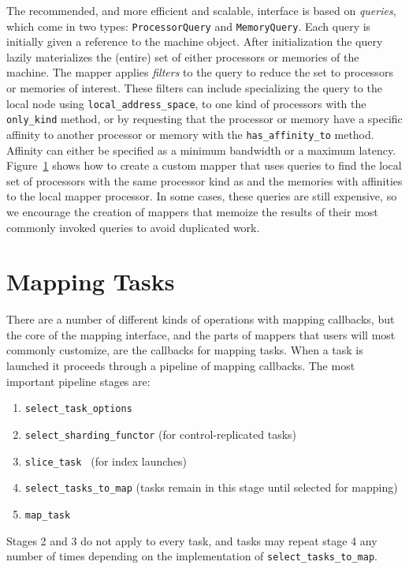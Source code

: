 The recommended, and more efficient and scalable, interface is based
on {\em queries}, which come in two types: {\tt ProcessorQuery} and 
{\tt MemoryQuery}. Each query is initially given a reference to the machine
object. After initialization the query lazily materializes the (entire) set of 
either processors or memories of the machine.
The mapper applies {\em filters} to the query to reduce the
set to processors or memories of interest.  These filters can include specializing
the query to the local node using {\tt local\_address\_space}, to one kind of processors with the {\tt only\_kind} method, or by
requesting that the processor or memory have a specific affinity to another
processor or memory with the {\tt has\_affinity\_to} method. Affinity can either be
specified as a minimum bandwidth or a maximum latency. Figure~\ref{fig:mapper_machine}
shows how to create a custom mapper that uses queries to find the local set of 
processors with the same processor kind as and the memories with affinities to the local
mapper processor. In some cases, these queries are still expensive, so we
encourage the creation of mappers that memoize the results of their most 
commonly invoked queries to avoid duplicated work.

\begin{figure}
  {\small
}
\caption{}
\label{fig:mapper_machine}
\end{figure}


\section{Mapping Tasks}
\label{sec:mapping:tasks}

There are a number of different kinds of operations with mapping callbacks, but the core of the mapping interface, and the parts
of mappers that users will most commonly customize, are the callbacks for mapping tasks.
When a task is launched it proceeds through a pipeline of mapping callbacks.  The most important pipeline stages are:
\begin{enumerate}
\item {\tt select\_task\_options }
\item {\tt select\_sharding\_functor} (for control-replicated tasks)
\item {\tt slice\_task }  (for index launches)
\item {\tt select\_tasks\_to\_map} (tasks remain in this stage until selected for mapping)
\item {\tt map\_task}
\end{enumerate}
Stages 2 and 3 do not apply to every task, and tasks may repeat stage 4 any number of times depending on the implementation of {\tt select\_tasks\_to\_map}.

